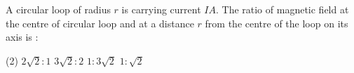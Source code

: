 \item A circular loop of radius $r$ is carrying current $IA$. The ratio of magnetic field at the centre of circular loop and at a distance $r$ from the centre of the loop on its axis is :
\begin{tasks}(2)
    \task $2\sqrt{2}:1$
    \task $3\sqrt{2}:2$
    \task $1:3\sqrt{2}$
    \task $1:\sqrt{2}$
\end{tasks}